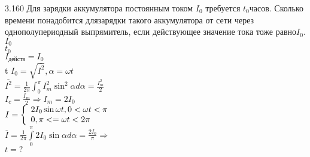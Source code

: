 \testCom
{%
	3.160
}
{%
	Для зарядки аккумулятора постоянным током ${I}_{0}$ требуется ${t}_{0}$часов. Сколько времени понадобится длязарядки такого аккумулятора от сети через однополупериодный выпрямитель, если действующее значение тока тоже равно${I}_{0}$.
}
{%
	${I}_{0}$\\
	${t}_{0}$\\
	${I}_{действ} = {I}_{0}$\\
}
{%
	t
}
{%
	${I}_{0} = \sqrt{\overline{I^2}}, \alpha = \omega t$\\
	$\overline{I^2} = \frac{1}{2 \pi} \int_0^\pi {I}_{m}^2 \sin^2 \alpha d\alpha = \frac{{I}_{m}^2}{2}$\\
	${I}_{c} = \frac{{I}_{m}}{2} \Rightarrow {I}_{m} = 2 {I}_{0}$\\
	$I = \left\{\begin{array}{l l}
			2 {I}_{0} \sin \omega t, 0<\omega t< \pi
			 \\0, \pi <= \omega t < 2 \pi
			\end{array}\right.$\\
	$\overline{I} = \frac{1}{2 \pi } \int\limits_0^\pi 2 {I}_{0} \sin \alpha d \alpha = \frac{2 {I}_{0}}{\pi} \Rightarrow$\\
	$t = ?$\\
	
}


